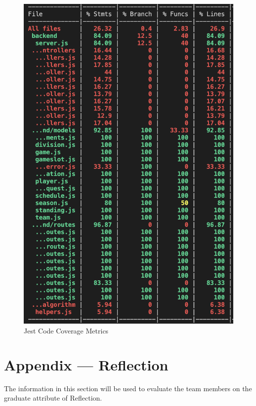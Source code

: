 \documentclass[12pt, titlepage]{article}
\begin{document}
\begin{figure}[htbp]
    \centering
    \includegraphics[width=\textwidth]{coverage.png}
    \caption{Jest Code Coverage Metrics}
    \label{fig:coverage}
\end{figure}




\newpage{}
\section*{Appendix --- Reflection}

The information in this section will be used to evaluate the team members on the
graduate attribute of Reflection.
\end{document}
